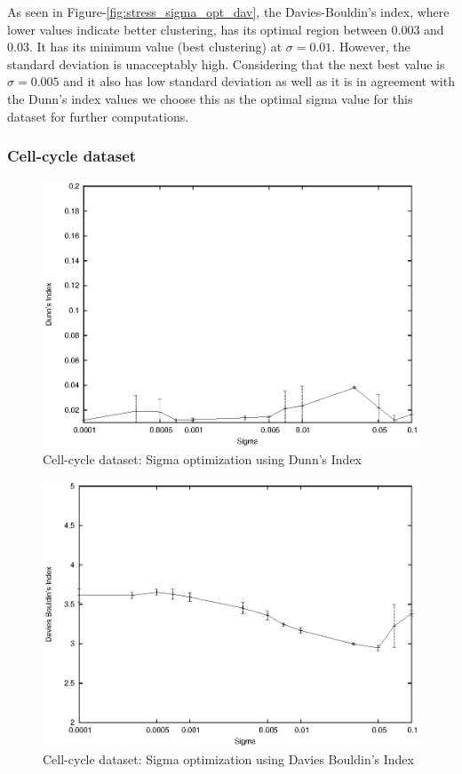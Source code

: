 As seen in Figure-\ref{fig:stress_sigma_opt_dav}, the Davies-Bouldin's index, where lower values indicate better clustering, has its optimal region between 0.003 and 0.03. It has its minimum value (best clustering) at $\sigma=0.01$. However, the standard deviation is unacceptably high.
Considering that the next best value is $\sigma=0.005$ and it also has low standard deviation as well as it is in agreement with the Dunn's index values we choose this as the optimal sigma value for this dataset for further computations.  

\subsubsection{Cell-cycle dataset}

\begin{figure}[p]
 \centering
 \includegraphics[scale=1.0]{images_only/semisup/results/plots/ccycle_dunn.eps}
 \caption{Cell-cycle dataset: Sigma optimization using Dunn's Index}
 \label{fig:ccycle_sigma_opt_dunn}
\end{figure}

\begin{figure}[p]
 \centering
 \includegraphics[scale=1.0]{images_only/semisup/results/plots/ccycle_davies.eps}
 \caption{Cell-cycle dataset: Sigma optimization using Davies Bouldin's Index}
 \label{fig:ccycle_sigma_opt_dav}
\end{figure}


